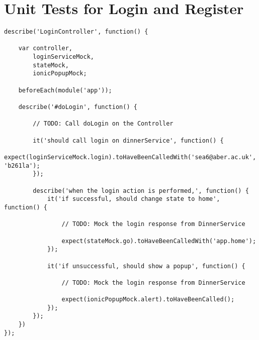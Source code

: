 \section{Unit Tests for Login and Register}
\begin{verbatim}
describe('LoginController', function() {

    var controller, 
        loginServiceMock,
        stateMock,
        ionicPopupMock;

    beforeEach(module('app'));  

    describe('#doLogin', function() {

        // TODO: Call doLogin on the Controller

        it('should call login on dinnerService', function() {
            expect(loginServiceMock.login).toHaveBeenCalledWith('sea6@aber.ac.uk', 'b261la'); 
        });

        describe('when the login action is performed,', function() {
            it('if successful, should change state to home', function() {

                // TODO: Mock the login response from DinnerService

                expect(stateMock.go).toHaveBeenCalledWith('app.home');
            });

            it('if unsuccessful, should show a popup', function() {

                // TODO: Mock the login response from DinnerService

                expect(ionicPopupMock.alert).toHaveBeenCalled();
            });
        });
    })
});
\end{verbatim}

